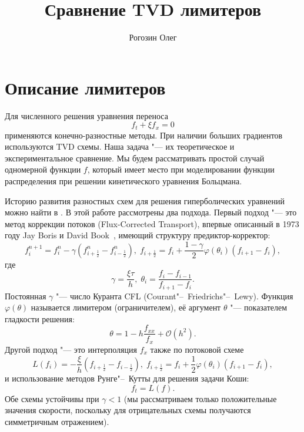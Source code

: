 \documentclass[a4paper,10pt]{article}
\title{Сравнение TVD лимитеров}
\author{Рогозин Олег}
\begin{document}
\maketitle
\tableofcontents

\section{Описание лимитеров}
Для численного решения уравнения переноса \[f_t+\xi f_x=0 \] применяются конечно-разностные методы.
При наличии больших градиентов используются TVD схемы. Наша задача "--- их теоретическое и экспериментальное сравнение.
Мы будем рассматривать простой случай одномерной функции \(f\), который имеет место при моделировании функции распределения
при решении кинетического уравнения Больцмана.

Историю развития разностных схем для решения гиперболических уравнений можно найти в \cite{vanLeer2006}. В этой работе рассмотрены два подхода.
Первый подход "--- это метод коррекции потоков (Flux-Corrected Transport), впервые описанный в 1973 году Jay Boris и David Book~\cite{Boris1973},
имеющий структуру предиктор-корректор:
\begin{equation}\label{eq:pk}
	f_i^{n+1} = f_i^n - \gamma(f_{i+\frac1{2}}^n-f_{i-\frac1{2}}^n),\; 
	f_{i+\frac1{2}} = f_i + \frac{1-\gamma}{2}\varphi(\theta_i)(f_{i+1} - f_i),
\end{equation}
где
\[ \gamma=\frac{\xi\tau}{h}, \; \theta_i = \frac{f_i - f_{i-1}}{f_{i+1} - f_i}.\]
Постоянная \(\gamma\) "--- число Куранта CFL (Courant"--~Friedrichs"--~Lewy). Функция \(\varphi(\theta)\) называется лимитером (ограничителем),
её аргумент \(\theta\) "--- показателем гладкости решения:
\[ \theta = 1-h\frac{f_{xx}}{f_x}+\mathcal{O}(h^2). \]
Другой подход "--- это интерполяция \(f_x\) также по потоковой схеме
\begin{equation}\label{eq:rk1}
	L(f_i) = - \frac{\xi}{h}(f_{i+\frac1{2}}-f_{i-\frac1{2}}),\;
	f_{i+\frac1{2}} = f_i + \frac1{2}\varphi(\theta_i)(f_{i+1} - f_i),
\end{equation}
и использование методов Рунге"--~Кутты для решения задачи Коши:
\begin{equation}\label{eq:rk2}
	f_t = L(f).
\end{equation}
Обе схемы устойчивы при \(\gamma < 1\) (мы рассматриваем только положительные значения скорости,
поскольку для отрицательных схемы получаются симметричным отражением).
\end{document}
